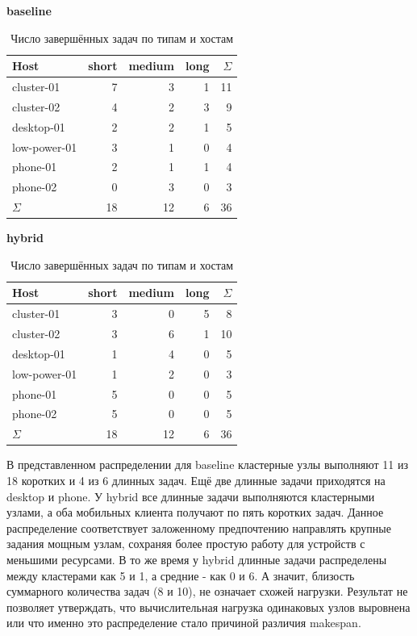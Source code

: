 \documentclass[a4paper,12pt]{extarticle}
\begin{document}
\begin{table}[H]
\centering
    \caption{Число завершённых задач по типам и хостам}
    \scriptsize
    \begin{minipage}{0.48\textwidth}
        \centering
        \textbf{baseline}
        \vspace{0.3em}
        \begin{tabular}{lrrrr}
\toprule
            Host & short & medium & long & $\Sigma$ \\
\midrule
            cluster-01 & 7 & 3 & 1 & 11 \\
            cluster-02 & 4 & 2 & 3 & 9 \\
            desktop-01 & 2 & 2 & 1 & 5 \\
            low-power-01 & 3 & 1 & 0 & 4 \\
            phone-01 & 2 & 1 & 1 & 4 \\
            phone-02 & 0 & 3 & 0 & 3 \\
            \midrule
            $\Sigma$ & 18 & 12 & 6 & 36 \\
\bottomrule
\end{tabular}
    \end{minipage}
    \hfill
    \begin{minipage}{0.48\textwidth}
        \centering
        \textbf{hybrid}
        \vspace{0.3em}
        \begin{tabular}{lrrrr}
            \toprule
            Host & short & medium & long & $\Sigma$ \\
            \midrule
            cluster-01 & 3 & 0 & 5 & 8 \\
            cluster-02 & 3 & 6 & 1 & 10 \\
            desktop-01 & 1 & 4 & 0 & 5 \\
            low-power-01 & 1 & 2 & 0 & 3 \\
            phone-01 & 5 & 0 & 0 & 5 \\
            phone-02 & 5 & 0 & 0 & 5 \\
            \midrule
            $\Sigma$ & 18 & 12 & 6 & 36 \\
            \bottomrule
        \end{tabular}
    \end{minipage}
\end{table}

В представленном распределении для baseline кластерные узлы выполняют 11 из 18 коротких и 4 из 6 длинных задач. Ещё две длинные задачи приходятся на desktop и phone. У hybrid все длинные задачи выполняются кластерными узлами, а оба мобильных клиента получают по пять коротких задач. Данное распределение соответствует заложенному предпочтению направлять крупные задания мощным узлам, сохраняя более простую работу для устройств с меньшими ресурсами. В то же время у hybrid длинные задачи распределены между кластерами как 5 и 1, а средние - как 0 и 6. А значит, близость суммарного количества задач (8 и 10), не означает схожей нагрузки. Результат не позволяет утверждать, что вычислительная нагрузка одинаковых узлов выровнена или что именно это распределение стало причиной различия makespan.
\end{document}
